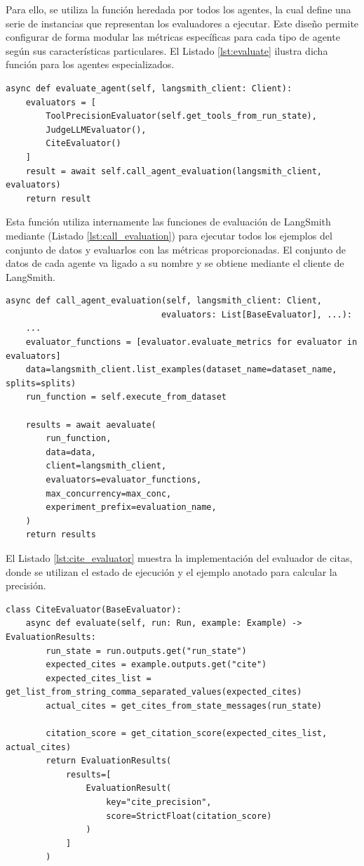 Para ello, se utiliza la función  heredada por todos los agentes, la cual define una serie de instancias  que representan los evaluadores a ejecutar. Este diseño permite configurar de forma modular las métricas específicas para cada tipo de agente según sus características particulares. El Listado \ref{lst:evaluate} ilustra dicha función para los agentes especializados.

\begin{lstlisting}[caption={Evaluación de agentes especializados},label={lst:evaluate}]
async def evaluate_agent(self, langsmith_client: Client):
    evaluators = [
        ToolPrecisionEvaluator(self.get_tools_from_run_state),
        JudgeLLMEvaluator(),
        CiteEvaluator()
    ]
    result = await self.call_agent_evaluation(langsmith_client, evaluators)
    return result
\end{lstlisting}

Esta función utiliza internamente las funciones de evaluación de LangSmith mediante  (Listado \ref{lst:call_evaluation}) para ejecutar todos los ejemplos del conjunto de datos y evaluarlos con las métricas proporcionadas. El conjunto de datos de cada agente va ligado a su nombre y se obtiene mediante el cliente de LangSmith.

\begin{lstlisting}[caption={Llamada a evaluación de agentes},label={lst:call_evaluation}]
async def call_agent_evaluation(self, langsmith_client: Client, 
                               evaluators: List[BaseEvaluator], ...):
    ...
    evaluator_functions = [evaluator.evaluate_metrics for evaluator in evaluators]
    data=langsmith_client.list_examples(dataset_name=dataset_name, splits=splits)
    run_function = self.execute_from_dataset

    results = await aevaluate(
        run_function,
        data=data,
        client=langsmith_client,
        evaluators=evaluator_functions,
        max_concurrency=max_conc,
        experiment_prefix=evaluation_name,
    )
    return results
\end{lstlisting}

El Listado \ref{lst:cite_evaluator} muestra la implementación del evaluador de citas, donde se utilizan el estado de ejecución y el ejemplo anotado para calcular la precisión.

\begin{lstlisting}[caption={Evaluador de citas},label={lst:cite_evaluator}]
class CiteEvaluator(BaseEvaluator):
    async def evaluate(self, run: Run, example: Example) -> EvaluationResults:
        run_state = run.outputs.get("run_state")
        expected_cites = example.outputs.get("cite")
        expected_cites_list = get_list_from_string_comma_separated_values(expected_cites)
        actual_cites = get_cites_from_state_messages(run_state)

        citation_score = get_citation_score(expected_cites_list, actual_cites)
        return EvaluationResults(
            results=[
                EvaluationResult(
                    key="cite_precision",
                    score=StrictFloat(citation_score)
                )
            ]
        )
\end{lstlisting}


